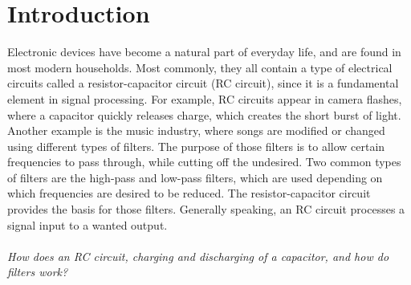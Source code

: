 \chapter{Introduction}
Electronic devices have become a natural part of everyday life, and are found in most modern households. Most commonly, they all contain a type of electrical circuits called a resistor-capacitor circuit (RC circuit), since it is a fundamental element in signal processing. For example, RC circuits appear in camera flashes, where a capacitor quickly releases charge, which creates the short burst of light. Another example is the music industry, where songs are modified or changed using different types of filters. The purpose of those filters is to allow certain frequencies to pass through, while cutting off the undesired. Two common types of filters are the high-pass and low-pass filters, which are used depending on which frequencies are desired to be reduced. The resistor-capacitor circuit provides the basis for those filters. Generally speaking, an RC circuit processes a signal input to a wanted output. 
\\ \\
\textit{How does an RC circuit, charging and discharging of a capacitor, and how do filters work?}

